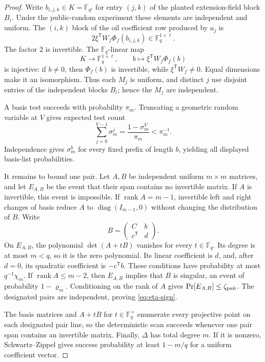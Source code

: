 \documentclass[11pt,a4paper]{article}
\theoremstyle{definition}
\theoremstyle{remark}
\newcommand{\F}{\mathbb F}
\newcommand{\rank}{\operatorname{rank}}
\begin{document}
\begin{proof}
Write $b_{i,j,k}\in K=\F_{q^\ell}$ for entry $(j,k)$ of the planted extension-field block $B_i$.  Under the public-random experiment these elements are independent and uniform.  The $(i,k)$ block of the oil coefficient row produced by $a_j$ is
\[
2\xi^{\mathsf T}W_f\Phi_f(b_{i,j,k})\in\F_q^{1\times\ell}.
\]
The factor $2$ is invertible.  The $\F_q$-linear map
\[
K\longrightarrow\F_q^{1\times\ell},
\qquad b\longmapsto \xi^{\mathsf T}W_f\Phi_f(b)
\]
is injective: if $b\ne0$, then $\Phi_f(b)$ is invertible, while $\xi^{\mathsf T}W_f\ne0$.  Equal dimensions make it an isomorphism.  Thus each $M_j$ is uniform, and distinct $j$ use disjoint entries of the independent blocks $B_i$; hence the $M_j$ are independent.

A basis test succeeds with probability $\pi_m$.  Truncating a geometric random variable at $V$ gives expected test count
\[
 \sum_{j=0}^{V-1}\sigma_m^j
 =\frac{1-\sigma_m^V}{\pi_m}<\pi_m^{-1}.
\]
Independence gives $\sigma_m^b$ for every fixed prefix of length $b$, yielding all displayed basis-list probabilities.

It remains to bound one pair.  Let $A,B$ be independent uniform $m\times m$ matrices, and let $E_{A,B}$ be the event that their span contains no invertible matrix.  If $A$ is invertible, this event is impossible.  If $\rank A=m-1$, invertible left and right changes of basis reduce $A$ to $\operatorname{diag}(I_{m-1},0)$ without changing the distribution of $B$.  Write
\[
B=\begin{pmatrix}C&b\\ c^{\mathsf T}&d\end{pmatrix}.
\]
On $E_{A,B}$, the polynomial $\det(A+tB)$ vanishes for every $t\in\F_q$.  Its degree is at most $m<q$, so it is the zero polynomial.  Its linear coefficient is $d$, and, after $d=0$, its quadratic coefficient is $-c^{\mathsf T}b$.  These conditions have probability at most $q^{-1}\chi_m$.  If $\rank A\le m-2$, then $E_{A,B}$ implies that $B$ is singular, an event of probability $1-\varrho_m$.  Conditioning on the rank of $A$ gives $\Pr[E_{A,B}]\le\zeta_{\rm pair}$.  The designated pairs are independent, proving \eqref{eq:eta-sign}.

The basis matrices and $A+tB$ for $t\in\F_q^\times$ enumerate every projective point on each designated pair line, so the deterministic scan succeeds whenever one pair span contains an invertible matrix.  Finally, $\Delta$ has total degree $m$.  If it is nonzero, Schwartz--Zippel gives success probability at least $1-m/q$ for a uniform coefficient vector.
\end{proof}
\end{document}
